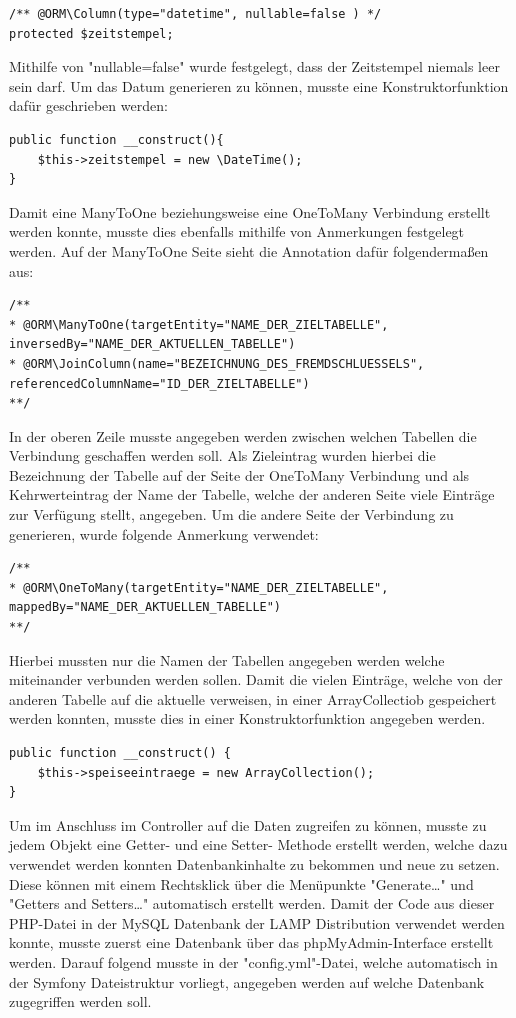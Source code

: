 	\lstset{language=php}
  	\begin{lstlisting}
/** @ORM\Column(type="datetime", nullable=false ) */
protected $zeitstempel;
  	\end{lstlisting}
Mithilfe von "nullable=false" wurde festgelegt, dass der Zeitstempel niemals leer sein darf.
Um das Datum generieren zu können, musste eine Konstruktorfunktion dafür geschrieben werden:

	\lstset{language=php}
  	\begin{lstlisting}
public function __construct(){
	$this->zeitstempel = new \DateTime();
}
\end{lstlisting}
Damit eine ManyToOne beziehungsweise eine OneToMany Verbindung erstellt werden konnte, musste dies ebenfalls mithilfe von Anmerkungen festgelegt werden.
Auf der ManyToOne Seite sieht die Annotation dafür folgendermaßen aus:

	\lstset{language=php}
  	\begin{lstlisting}
/**
* @ORM\ManyToOne(targetEntity="NAME_DER_ZIELTABELLE",
inversedBy="NAME_DER_AKTUELLEN_TABELLE")
* @ORM\JoinColumn(name="BEZEICHNUNG_DES_FREMDSCHLUESSELS",
referencedColumnName="ID_DER_ZIELTABELLE")
**/
  	\end{lstlisting}
In der oberen Zeile musste angegeben werden zwischen welchen Tabellen die Verbindung geschaffen werden soll. Als Zieleintrag wurden hierbei die Bezeichnung der Tabelle auf der Seite der OneToMany Verbindung und als Kehrwerteintrag der Name der Tabelle, welche der anderen Seite viele Einträge zur Verfügung stellt, angegeben.
Um die andere Seite der Verbindung zu generieren, wurde folgende Anmerkung verwendet:

	\lstset{language=php}
  	\begin{lstlisting}
/**
* @ORM\OneToMany(targetEntity="NAME_DER_ZIELTABELLE",
mappedBy="NAME_DER_AKTUELLEN_TABELLE")
**/
  	\end{lstlisting}
Hierbei mussten nur die Namen der Tabellen angegeben werden welche miteinander verbunden werden sollen. Damit die vielen Einträge, welche von der anderen Tabelle auf die aktuelle verweisen, in einer ArrayCollectiob gespeichert werden konnten, musste dies in einer Konstruktorfunktion angegeben werden.

	\lstset{language=php}
  	\begin{lstlisting}
public function __construct() {
	$this->speiseeintraege = new ArrayCollection();
}
  	\end{lstlisting}
Um im Anschluss im Controller auf die Daten zugreifen zu können, musste zu jedem Objekt eine Getter- und eine Setter- Methode erstellt werden, welche dazu verwendet werden konnten Datenbankinhalte zu bekommen und neue zu setzen. Diese können mit einem Rechtsklick über die Menüpunkte "Generate…" und "Getters and Setters…" automatisch erstellt werden.
Damit der Code aus dieser PHP-Datei in der MySQL Datenbank der LAMP Distribution verwendet werden konnte, musste zuerst eine Datenbank über das phpMyAdmin-Interface erstellt werden. Darauf folgend musste in der "config.yml"-Datei, welche automatisch in der Symfony Dateistruktur vorliegt, angegeben werden auf welche Datenbank zugegriffen werden soll.

